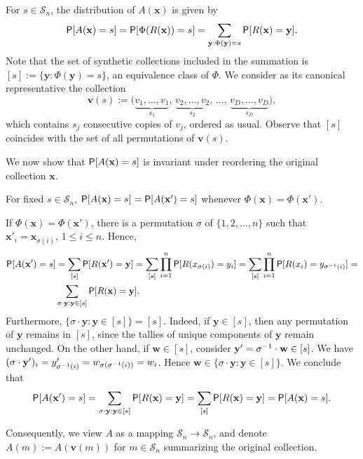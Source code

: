 \documentclass[11pt,draft]{article}
\newcommand{\Ssp}{\mathcal{S}}
\newcommand{\xv}{\mathbf{x}}
\newcommand{\yv}{\mathbf{y}}
\newcommand{\vv}{\mathbf{v}}
\begin{document}
For $s\in\Ssp_n$, the distribution of $A(\xv)$ is given by
\begin{equation}\label{eq:Adist}
\P[A(\xv) = s] = \P[\Phi(R(\xv)) = s]
= \sum_{\yv:\Phi(\yv) = s} \P[R(\xv) = \yv]
.
\end{equation}
Note that the set of synthetic collections included in the summation is
$[s] := \{\yv:\Phi(\yv) = s\}$, an equivalence class of $\Phi$.
We consider as its canonical representative the collection
\[ \vv(s) := \big(\underbrace{v_1,\dots,v_1}_{s_1},\,
   \underbrace{v_2,\dots,v_2}_{s_2},\,\dots,\,
   \underbrace{v_D,\dots,v_D}_{s_D}\big), \]
which contains $s_j$ consecutive copies of $v_j$, ordered as usual.
Observe that $[s]$ coincides with the set of all permutations of $\vv(s)$.

We now show that $\P[A(\xv) = s]$ is invariant under reordering the original
collection $\xv$.

\begin{prop}
For fixed $s\in\Ssp_n$, $\P[A(\xv) = s] = \P[A(\xv') = s]$ whenever
$\Phi(\xv) = \Phi(\xv')$.
\end{prop}
\begin{pf}
If $\Phi(\xv) = \Phi(\xv')$, there is a permutation $\sigma$ of
$\{1,2,\dots,n\}$ such that
$\xv'_i = \xv_{\sigma(i)}$, $1 \leq i \leq n$.
Hence,
\begin{align*}
\P[A(\xv') = s] &= \sum_{[s]} \P[R(\xv') = \yv] =
\sum_{[s]} \prod_{i = 1}^n \P[R(x_{\sigma(i)}) = y_i] =
\sum_{[s]} \prod_{i = 1}^n \P[R(x_{i}) = y_{\inv{\sigma}(i)}] = \\
&\sum_{\sigma\cdot\yv : \yv \in [s]} \P[R(\xv) = \yv].
\end{align*}
Furthermore, $\{\sigma\cdot\yv : \yv \in [s]\} = [s]$.
Indeed, if $\yv\in [s]$, then any permutation of $\yv$ remains in $[s]$,
since the tallies of unique components of $\yv$ remain unchanged.
On the other hand, if $\mathbf{w} \in [s]$, consider
$\yv' = \inv{\sigma}\cdot\mathbf{w} \in [s]$.
We have $(\sigma\cdot\yv')_i = y'_{\inv{\sigma}(i)} =
w_{\sigma(\inv{\sigma}(i))} = w_i$.
Hence $\mathbf{w} \in \{\sigma\cdot\yv : \yv \in [s]\}$.
We conclude that
\[ \P[A(\xv') = s] = \sum_{\sigma\cdot\yv : \yv \in [s]} \P[R(\xv) = \yv] =
\sum_{[s]} \P[R(\xv) = \yv] = \P[A(\xv) = s]. \]
\end{pf}

Consequently, we view $A$ as a mapping $\Ssp_n \rightarrow \Ssp_n$, and denote
$A(m) := A(\vv(m))$ for $m\in\Ssp_n$ summarizing the original collection.
\end{document}
